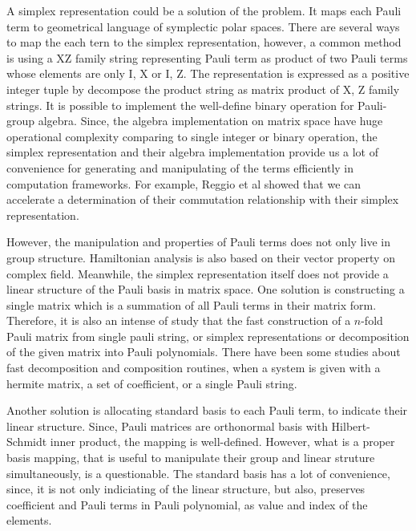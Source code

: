 \documentclass[twocolumn]{article}
\begin{document}
A simplex representation could be a solution of the problem. 
It maps each Pauli term to geometrical language of symplectic polar spaces\cite{havlicek_moebius_2009}.
There are several ways to map the each tern to the simplex representation, 
however, a common method is using a XZ family string representing Pauli term as product of two Pauli terms whose elements are only I, X or I, Z.
The representation is expressed as a positive integer tuple by decompose the product string as matrix product of X, Z family strings.
It is possible to implement the well-define binary operation for Pauli-group algebra.
Since, the algebra implementation on matrix space have huge operational complexity comparing to 
single integer or binary operation, the simplex representation and their algebra implementation 
provide us a lot of convenience for generating and manipulating of the terms efficiently in computation frameworks.
For example, Reggio et al showed that we can accelerate a determination of their commutation relationship 
with their simplex representation\cite{reggio_fast_2023}.

However, the manipulation and properties of Pauli terms does not only live in group structure. 
Hamiltonian analysis is also based on their vector property on complex field. 
Meanwhile, the simplex representation itself does not provide a linear structure
of the Pauli basis in matrix space.
One solution is constructing a single matrix which is a summation of all Pauli terms in their matrix form.%
Therefore, it is also an intense of study that the fast construction of a $n$-fold Pauli matrix from single pauli string, 
or simplex representations or decomposition of the given matrix into Pauli polynomials.
There have been some studies about fast decomposition\cite{hantzko_tensorized_2023, koska_tree-approach_2024, ying_preparing_2023} %
and composition\cite{vidal_romero_paulicomposer_2023} routines,%
when a system is given with a hermite matrix, a set of coefficient, or a single Pauli string.

Another solution is allocating standard basis to each Pauli term, to indicate their 
linear structure. Since, Pauli matrices are orthonormal basis with Hilbert-Schmidt inner product\cite{nielsen2010quantum},
the mapping is well-defined. However, what is a proper basis mapping, that is useful to manipulate their group and linear 
struture simultaneously, is a questionable. 
The standard basis has a lot of convenience, since, it is not only indiciating of the linear structure, 
but also, preserves coefficient and Pauli terms in Pauli polynomial, as value and index of the elements. 
\end{document}
